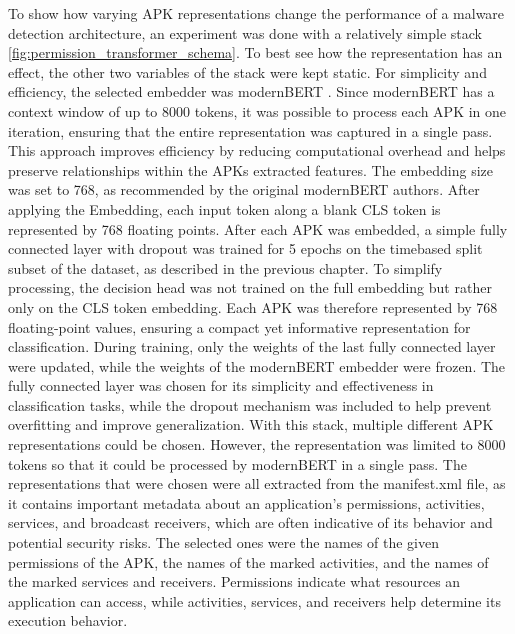 To show how varying APK representations change the performance of a malware detection 
architecture, an experiment was done with a relatively simple stack 
\ref{fig:permission_transformer_schema}. 
To best see how the representation has an effect, 
the other two variables of the stack were kept static. 
For simplicity and efficiency, the selected embedder was modernBERT \cite{modernbert}. 
Since modernBERT has a context window of up to 8000 tokens, 
it was possible to process each APK in one iteration, 
ensuring that the entire representation was captured in a single pass. 
This approach improves efficiency by reducing computational overhead and helps preserve 
relationships within the APKs extracted features. 
The embedding size was set to 768, as recommended by the original modernBERT authors. 
After applying the Embedding, each input token along a blank CLS token is represented
by 768 floating points.
After each APK was embedded, a simple fully connected layer with dropout was 
trained for 5 epochs on the timebased 
split subset of the dataset, as described in the previous chapter. 
To simplify processing, the decision head was not trained on the full 
embedding but rather only on the CLS token embedding. Each APK was therefore 
represented by 768 floating-point values, ensuring a compact yet 
informative representation for classification.
During training, only the weights of the last fully connected layer were updated, 
while the weights of the modernBERT embedder were frozen.
The fully connected layer was chosen for its simplicity and effectiveness in 
classification tasks, while the dropout mechanism was included to help prevent overfitting 
and improve generalization. With this stack, 
multiple different APK representations could be chosen. 
However, the representation was limited to 8000 tokens so that it could be 
processed by modernBERT in a single pass. 
The representations that were chosen were all extracted from the manifest.xml file, 
as it contains important metadata about an application's permissions, activities, services, 
and broadcast receivers, which are often indicative of its behavior and potential security risks. 
The selected ones were the names of the given permissions of the APK, 
the names of the marked activities, 
and the names of the marked services and receivers. 
Permissions indicate what resources an application can access, 
while activities, services, and receivers help determine its execution behavior. 

